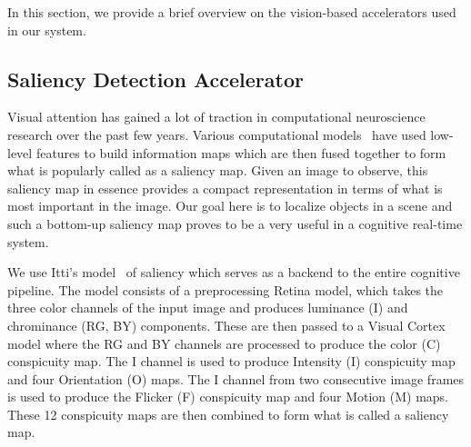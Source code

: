 In this section, we provide a brief overview on the vision-based accelerators used in our system. 

\subsection{Saliency Detection Accelerator}
Visual attention has gained a lot of traction in computational neuroscience research over the past few years. Various computational models~\cite{Itti1998,Itti2001,Bruce2009a} have used low-level features to build information maps which are then fused together to form what is popularly called as a saliency map. Given an image to observe, this saliency map in essence provides a compact representation in terms of what is most important in the image. 
Our goal here is to localize objects in a scene and such a bottom-up saliency map proves to be a very useful in a cognitive real-time system.

We use Itti's model~\cite{Peters2007} of saliency which serves as a backend to the entire cognitive pipeline. The model consists of a preprocessing Retina model, which takes the three color channels of the input image and produces luminance (I) and chrominance (RG, BY) components. These are then passed to a Visual Cortex model where the RG and BY channels are processed to produce the color (C) conspicuity map. The I channel is used to produce Intensity (I) conspicuity map and four Orientation (O) maps. The I channel from two consecutive image frames is used to produce the Flicker (F) conspicuity map and four Motion (M) maps. These 12 conspicuity maps are then combined to form what is called a saliency map. 
